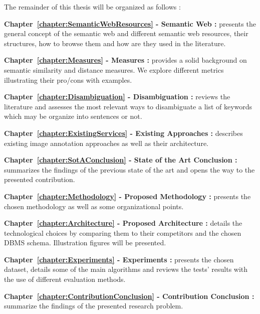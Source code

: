 The remainder of this thesis will be organized as follows :
\begin{description}
\item\textbf{Chapter~\ref{chapter:SemanticWebResources} - Semantic Web :} presents the general concept of the semantic web and different semantic web resources, their structures, how to browse them and how are they used in the literature. 
\item\textbf{Chapter~\ref{chapter:Measures} - Measures :} provides a solid background on semantic similarity and distance measures. We explore different metrics illustrating their pro/cons with examples.
\item\textbf{Chapter~\ref{chapter:Disambiguation} - Disambiguation :} reviews the literature and assesses the most relevant ways to disambiguate a list of keywords which may be organize into sentences or not. 
\item\textbf{Chapter~\ref{chapter:ExistingServices} - Existing Approaches :} describes existing image annotation approaches as well as their architecture.
\item\textbf{Chapter~\ref{chapter:SotAConclusion} - State of the Art Conclusion :} summarizes the findings of the previous state of the art and opens the way to the presented contribution.
\item\textbf{Chapter~\ref{chapter:Methodology} - Proposed Methodology :} presents the chosen methodology as well as some organizational points.
\item\textbf{Chapter~\ref{chapter:Architecture} - Proposed Architecture :} details the technological choices by comparing them to their competitors and the chosen DBMS schema. Illustration figures will be presented.
\item\textbf{Chapter~\ref{chapter:Experiments} - Experiments :} presents the chosen dataset, details some of the main algorithms and reviews the tests' results with the use of different evaluation methods.
\item\textbf{Chapter~\ref{chapter:ContributionConclusion} - Contribution Conclusion :} summarize the findings of the presented research problem.
\end{description}

